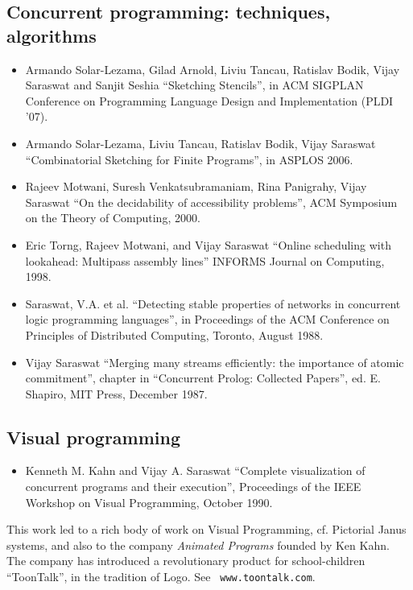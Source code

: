 \documentclass{article}
\begin{document}
\subsection*{Concurrent programming: techniques, algorithms}
\begin{itemize} 

\item Armando Solar-Lezama, Gilad Arnold, Liviu Tancau, Ratislav
Bodik, Vijay Saraswat and Sanjit Seshia ``Sketching Stencils'', in ACM
SIGPLAN Conference on Programming Language Design and Implementation
(PLDI '07).

\item Armando Solar-Lezama, Liviu Tancau, Ratislav Bodik, Vijay
Saraswat ``Combinatorial Sketching for Finite Programs'', in ASPLOS
2006.

\item   Rajeev Motwani, Suresh Venkatsubramaniam, Rina Panigrahy, Vijay
   Saraswat ``On the decidability of accessibility problems'', ACM
   Symposium on the Theory of Computing, 2000.

\item   Eric Torng, Rajeev Motwani, and Vijay Saraswat ``Online
   scheduling with lookahead: Multipass assembly lines''
   INFORMS Journal on Computing, 1998.

\item   Saraswat, V.A. et al. ``Detecting stable properties
   of networks in concurrent logic programming languages'', in
   Proceedings of the ACM Conference on Principles of
   Distributed Computing, Toronto, August 1988.
  
\item   Vijay Saraswat ``Merging many streams efficiently: the
   importance of atomic commitment'', chapter in ``Concurrent
   Prolog: Collected Papers'', ed. E. Shapiro, MIT Press, December
   1987.
\end{itemize}

\subsection*{Visual programming}
\begin{itemize} 
\item    Kenneth M. Kahn and Vijay A. Saraswat ``Complete
    visualization of concurrent programs and their execution'',
    Proceedings of the IEEE Workshop on Visual Programming, October
    1990. 
\end{itemize} 

This work led to a rich body of work on Visual Programming, cf.{}
Pictorial Janus systems, and also to the company \textit{ Animated
Programs} founded by Ken Kahn. The company has introduced a
revolutionary product for school-children ``ToonTalk'', in the
tradition of Logo. See \texttt{ www.toontalk.com}.
    
\end{document}
